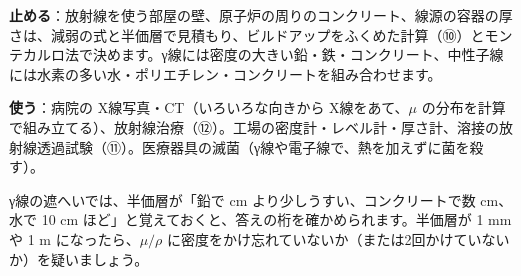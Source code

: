 \begin{phkougaku}
\textbf{止める}：放射線を使う部屋の壁、原子炉の周りのコンクリート、線源の容器の厚さは、減弱の式と半価層で見積もり、ビルドアップをふくめた計算（⑩）とモンテカルロ法で決めます。γ線には密度の大きい鉛・鉄・コンクリート、中性子線には水素の多い水・ポリエチレン・コンクリートを組み合わせます。

\textbf{使う}：病院の X線写真・CT（いろいろな向きから X線をあて、$\mu$ の分布を計算で組み立てる）、放射線治療（⑫）。工場の密度計・レベル計・厚さ計、溶接の放射線透過試験（⑪）。医療器具の滅菌（γ線や電子線で、熱を加えずに菌を殺す）。

\begin{phketa}[放射線と物の数の目安]
γ線の遮へいでは、半価層が「鉛で cm より少しうすい、コンクリートで数 cm、水で 10 cm ほど」と覚えておくと、答えの桁を確かめられます。半価層が 1 mm や 1 m になったら、$\mu/\rho$ に密度をかけ忘れていないか（または2回かけていないか）を疑いましょう。
\end{phketa}
\end{phkougaku}

